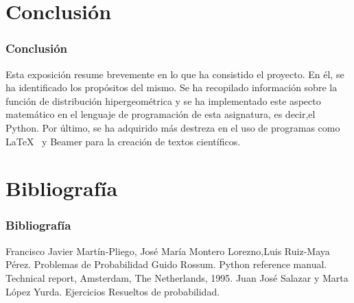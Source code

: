 \documentclass[10pt]{beamer}
\begin{document}

\section{Conclusión}
\begin{frame}
\frametitle{Conclusión}

Esta exposición resume brevemente en lo que ha consistido el proyecto. En él, se ha identificado los propósitos del mismo.
Se ha recopilado información sobre la función de distribución hipergeométrica y se ha implementado este aspecto matemático en el lenguaje de programación de esta asignatura, es decir,el Python.
Por último, se ha adquirido más destreza en el uso de programas como \LaTeX{}~ y Beamer para la creación de textos científicos.

\end{frame}


\section{Bibliografía}
\begin{frame}
\frametitle{Bibliografía}
\begin{thebibliography}{10}
\beamertemplatebookbibitems
\bibitem{}
Francisco Javier Martín-Pliego, José María Montero Lorezno,Luis Ruiz-Maya Pérez. Problemas de Probabilidad 
\bibitem{}
Guido Rossum. Python reference manual. Technical report, Amsterdam, The Netherlands, 1995.
\bibitem{}
Juan José Salazar y Marta López Yurda. Ejercicios Resueltos de probabilidad.

\end{thebibliography}
\end{frame}
\end{document}
